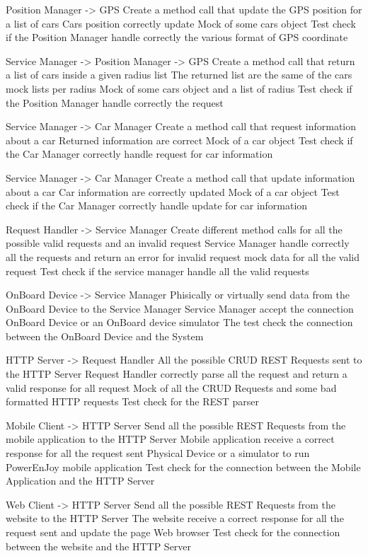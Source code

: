 \teststep 
{ Position Manager -> GPS}
{Create a method call that update the GPS position for a list of cars }
{Cars position correctly update}
{Mock of some cars object  }
{Test check if the Position Manager handle correctly the various format of GPS coordinate}


\teststep 
{ Service Manager -> Position Manager -> GPS}
{Create a method call that return a list of cars inside a given radius list }
{The returned list are the same of the cars mock lists per radius}
{Mock of some cars object and a list of radius  }
{Test check if the Position Manager handle correctly the request}

\teststep 
{ Service Manager -> Car Manager }
{Create a method call that request information about a car }
{Returned information are correct}
{Mock of a car object}
{Test check if the Car Manager correctly handle request for car information}

\teststep 
{ Service Manager -> Car Manager }
{Create a method call that update information about a car }
{Car information are correctly updated}
{Mock of a car object}
{Test check if the Car Manager correctly handle update for car information}

\teststep 
{ Request Handler -> Service Manager }
{Create different method calls for all the possible valid requests and an invalid request }
{Service Manager handle correctly all the requests and return an error for invalid request}
{mock data for all the valid request}
{Test check if the service manager handle all the valid requests}

\teststep 
{OnBoard Device -> Service Manager }
{Phisically or virtually send data from the OnBoard Device to the Service Manager }
{Service Manager accept the connection }
{OnBoard Device or an OnBoard device simulator}
{The test check the connection between the OnBoard Device and the System}


\teststep 
{ HTTP Server -> Request Handler }
{All the possible CRUD REST Requests sent to the HTTP Server }
{Request Handler correctly parse all the request and return a valid response for all request}
{Mock of all the CRUD Requests and some bad formatted HTTP requests}
{Test check for the REST parser}


\teststep 
{Mobile Client -> HTTP Server }
{Send all the possible REST Requests from the mobile application to the HTTP Server }
{Mobile application receive a correct response for all the request sent}
{Physical Device or a simulator to run PowerEnJoy mobile application}
{Test check for the connection between the Mobile Application and the HTTP Server}


\teststep 
{Web Client -> HTTP Server }
{Send all the possible REST Requests from the website to the HTTP Server }
{The website receive a correct response for all the request sent and update the page}
{Web browser}
{Test check for the connection between the website and the HTTP Server}

